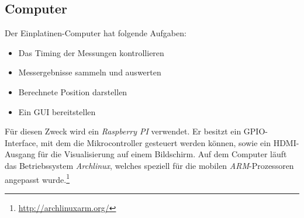 \subsection{Computer}
Der Einplatinen-Computer hat folgende Aufgaben:
\begin{itemize}
	\item Das Timing der Messungen kontrollieren
	\item Messergebnisse sammeln und auswerten
	\item Berechnete Position darstellen
	\item Ein \ac{GUI} bereitstellen %
\end{itemize}
Für diesen Zweck wird ein \textit{Raspberry PI} verwendet. Er besitzt ein \ac{GPIO}-Interface, mit dem die Mikrocontroller gesteuert werden können, sowie ein \ac{HDMI}-Ausgang für die Visualisierung auf einem Bildschirm. Auf dem Computer läuft das Betriebssystem \textit{Archlinux}, welches speziell für die mobilen \textit{ARM}-Prozessoren angepasst wurde.\footnote{\url{http://archlinuxarm.org/}}



